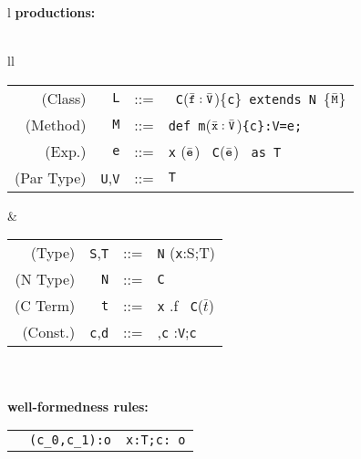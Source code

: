 
\begin{figure*}
\footnotesize
\begin{tabular}{l}
{\bf \FX{} productions:} \\
\quad\\
\begin{tabular}{ll}
\begin{tabular}{r@{\quad}rcl}
  (Class) & {\tt L} &{::=}& \klass\ {\tt C}($\bar{\tt f}:\bar{\tt V}$)\{{\tt c}\}\ {\tt extends}\ {\tt N}\ \{$\bar{\tt M}$\} \\
  (Method)& {\tt M} &{::=}& {\tt def}\ {\tt m}($\bar{\tt x}:\bar{\tt V}$){\tt \{c\}:V=e;}\\
  (Exp.)& {\tt e} &{::=}& {\tt x} \alt \this \alt {\tt e.f} \alt {\tt e.m}($\bar{\tt e}$) 
   \alt \new\ {\tt C}($\bar{\tt e}$) \alt {\tt e}\ \mbox{{\tt as} {\tt T}} \\ 
  (Par Type) & {\tt U},{\tt V}&{::=} & {\tt T} \\
\end{tabular} 
&
\begin{tabular}{r@{\quad}rcl}
  (Type)& {\tt S},{\tt T}&{::=}& {\tt N} \alt {\tt T\{c\}} \alt ({\tt x}:S;T)\\
  (N Type) & {\tt N}&{::=}& {\tt C} \alt {\tt N\{c\}}\\
  (C Term) & {\tt t} &{::=}& {\tt x} \alt \self \alt \this \alt {\tt t}.f \alt \new\ {\tt C}($\bar{t}$)\\
  (Const.) & {\tt c},{\tt d} &{::=}&\true \alt {\tt t==t} \alt {\tt c},{\tt c} \alt {\tt x}:{\tt V};{\tt c}\\
\end{tabular} 
\end{tabular}
\quad \\
\quad\\
{\bf \FX{} well-formedness rules:}\\[-12pt]
{\tabcolsep=0pt
\begin{tabular}{p{}p{}p{}}
\infax[True]{\Gamma \vdash {\tt true}: {\tt o}}
&
\infrule[And]
	{\Gamma\tt  \vdash c_0: o \andalso \Gamma \vdash c_1: o}
	{\Gamma\tt \vdash (c_0,c_1):o}
&
\infrule[Exists]
	{\Gamma\tt \vdash t: T \andalso \Gamma \vdash c[t/x]:o}
	{\Gamma\tt \vdash x:T;c: o}
\\
\end{tabular}}
\quad\\[-12pt]
{\tabcolsep=0pt
\begin{tabular}{p{}p{}p{}}

\end{tabular}}
\end{tabular}
\end{figure*}
